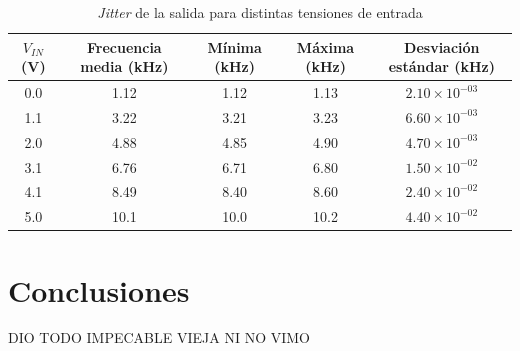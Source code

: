 \documentclass[../../tc_tp6_main.tex]{subfiles}
\begin{document}
\begin{table}[H]
	\centering
	\begin{tabular}{|c||c|c|c|c|}
	\hline
	$V_{IN}$ (V) 	& Frecuencia media (kHz) 	& M\'inima (kHz) 	& M\'axima (kHz) 	& Desviaci\'on est\'andar (kHz) 	\\ \hline \hline
	0.0          		& 1.12                   		& 1.12                      	& 1.13                      	& $2.10\times 10^{-03}$           	\\ \hline
	1.1          		& 3.22                   		& 3.21                      	& 3.23                      	& $6.60\times 10^{-03}$           	\\ \hline
	2.0          		& 4.88                   		& 4.85                      	& 4.90                      	& $4.70\times 10^{-03}$           	\\ \hline
	3.1          		& 6.76                   		& 6.71                     	& 6.80                      	& $1.50\times 10^{-02}$           	\\ \hline
	4.1          		& 8.49                   		& 8.40                      	& 8.60                      	& $2.40\times 10^{-02}$          	\\ \hline
	5.0          		& 10.1                   		& 10.0                      	& 10.2                      	& $4.40\times 10^{-02}$           	\\ \hline
	\end{tabular}
	\caption{\textit{Jitter} de la salida para distintas tensiones de entrada}
\end{table}




\section{Conclusiones}

DIO TODO IMPECABLE VIEJA NI NO VIMO
\end{document}
